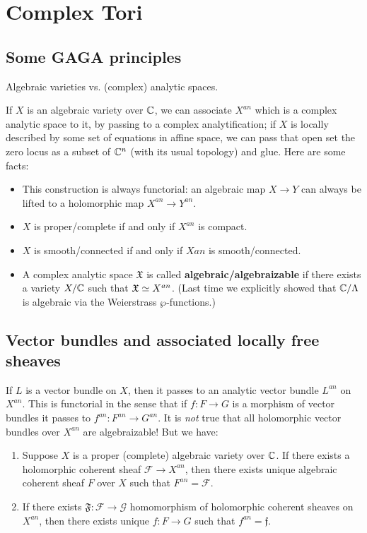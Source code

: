 



\section{Complex Tori}\label{Chapters/2-complextori}

\subsection{Some GAGA principles}
Algebraic varieties vs. (complex) analytic spaces. 

If $X$ is an algebraic variety over ${\mathbb C}$, we can associate $X^{an}$ which is a complex analytic space to it, by passing to a complex analytification; if $X$ is locally described by some set of equations in affine space, we can pass that open set the zero locus as a subset of ${\mathbb C}^n$ (with its usual topology) and glue. 
Here are some facts:

\begin{itemize}
\item 
This construction is always functorial: an algebraic map $X\to Y$ can always be lifted to a holomorphic map $X^{an}\to Y^{an}$. 
\item $X$ is proper/complete if and only if $X^{an}$ is compact. 
\item $X$ is smooth/connected if and only if $X{an}$ is smooth/connected. 


\item A complex analytic space $\mathfrak{X}$ is called \textbf{algebraic/algebraizable} if there exists a variety $X/{\mathbb C}$ such that $\mathfrak{X}\simeq X^{an}$. (Last time we explicitly showed that ${\mathbb C}/\Lambda$ is algebraic via the Weierstrass $\wp$-functions.)
\end{itemize}

\subsection{Vector bundles and associated locally free sheaves}

If $L$ is a vector bundle on $X$, then it passes to an analytic vector bundle $L^{an}$ on $X^{an}$. 
This is functorial in the sense that if $f:F\to G$ is a morphism of vector bundles it passes to $f^{an}:F^{an}\to G^{an}$. It is \emph{not} true that all holomorphic vector bundles over $X^{an}$ are algebraizable! But we have:

\begin{theorem}[Serre]
\noindent 
\begin{enumerate}
\item Suppose $X$ is a proper (complete) algebraic variety over ${\mathbb C}$. If there exists a holomorphic coherent sheaf $\mathcal{F}\to X^{an}$, then there exists unique algebraic coherent sheaf $F$ over $X$ such that $F^{an}=\mathcal{F}$.
\item If there exists $\mathfrak{F}:\mathcal{F}\to \mathcal{G}$ homomorphism of holomorphic coherent sheaves on $X^{an}$, then there exists unique $f:F\to G$ such that $f^{an}=\mathfrak{f}$.
\end{enumerate}
\end{theorem}

